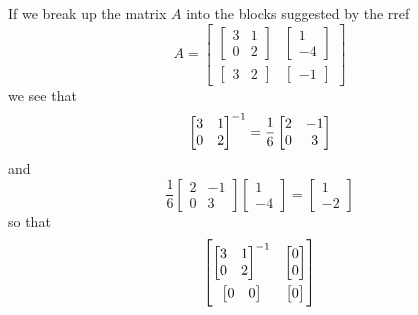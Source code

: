 \documentclass[../MathsNotesBase.tex]{subfiles}
\begin{document}
{\begin{exe}
{				If we break up the matrix $A$ into the blocks suggested by the rref
				\[ A = \begin{bmatrix}
							\begin{bmatrix}
							3 & 1\\
							0 & 2
							\end{bmatrix} & 
							\begin{bmatrix}
							1  \\
							-4
							\end{bmatrix} \\[10pt]
							\begin{bmatrix}3 & 2\end{bmatrix} & \begin{bmatrix}-1\end{bmatrix}
						\end{bmatrix}
				\]
				we see that
				\[ {\begin{bmatrix}
							3 & 1\\
							0 & 2	
						\end{bmatrix}}^{-1} =
						\frac{1}{6}
						\begin{bmatrix}
							2 & -1\\
							0 & 3
						\end{bmatrix}
				\]
				and
				\[ \frac{1}{6}
					\begin{bmatrix}
						2 & -1\\
						0 & 3
					\end{bmatrix}
					\begin{bmatrix}
						1  \\
						-4
					\end{bmatrix} =
					\begin{bmatrix}
						1  \\
						-2
					\end{bmatrix}
				\]
				so that
				\[ \begin{bmatrix}
						{\begin{bmatrix}
							3 & 1\\
							0 & 2
						\end{bmatrix}}^{-1} & 
						\begin{bmatrix}
							0  \\
							0
						\end{bmatrix} \\[10pt]
						\begin{bmatrix}0 & 0\end{bmatrix} & \begin{bmatrix}0\end{bmatrix}

\end{bmatrix}\]}
\end{exe}}
\end{document}
